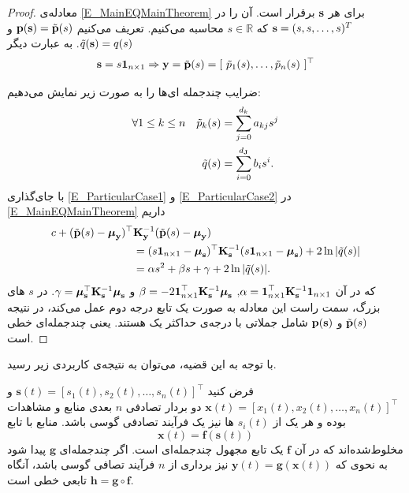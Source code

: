 \documentclass[oneside]{thesis}
\begin{document}
\begin{proof}
معادله‌ی 
 \eqref{E_MainEQMainTheorem}
 برای هر 
 $\mathbf{s}$
 برقرار است. آن را در 
 $\mathbf{s} = (s, s, \dots, s)^T$
که
$s\in \mathbb{R}$
 محاسبه می‌کنیم.  تعریف می‌کنیم
 ${\bf p}(\mathbf{s}) = \tilde{{\bf p}}(s)$
 و 
 $\tilde{{q}}(\mathbf{s}) = q(s)$.
 به عبارت دیگر
 \begin{equation}
 {\bf s}=s\boldsymbol{1}_{n \times 1} \Rightarrow
 {\bf y}=\tilde{\bf p}(s)=[\ \tilde{p}_1(s),\dots,\tilde{p}_n(s)\ ]^\top
 \end{equation}
 
ضرایب چندجمله‌ ای‌ها را به صورت زیر نمایش می‌دهیم:
 \begin{align}
 \label{E_ParticularCase1}
 \forall 1 \le k \le n \quad
 \tilde{p}_k(s) &= \sum_{j=0}^{d_k} a_{kj}s^{j} \\
 \label{E_ParticularCase2}
 \tilde{q}(s) &= \sum_{i=0}^{d_{\bf J}} b_{i}s^{i}.
 \end{align}
با جای‌گذاری
\eqref{E_ParticularCase1} و
\eqref{E_ParticularCase2} 
در
\eqref{E_MainEQMainTheorem} 
داریم
\begin{align}
\label{E_ParticularMainEQ}
c + (\tilde{\bf p}(s)-\boldsymbol{\mu}_{\bf y})^\top
&
{\bf K}_{\bf y}^{-1}(\tilde{\bf p}(s)-\boldsymbol{\mu}_{\bf y}) \nonumber \\
&= (s \boldsymbol{1}_{n \times 1}-\boldsymbol{\mu}_{\bf s})^\top{\bf K}_{\bf s}^{-1}(s \boldsymbol{1}_{n \times 1}-\boldsymbol{\mu}_{\bf s}) + 2\ln |\tilde{q}(s)| \nonumber \\
&= \alpha s^2 + \beta s + \gamma + 2\ln |\tilde{q}(s)|.
\end{align}
که در آن
$\alpha = \boldsymbol{1}_{n \times 1}^\top{\bf K}_{\bf s}^{-1}\boldsymbol{1}_{n \times 1}$, $\beta = -2\boldsymbol{1}_{n \times 1}^\top{\bf K}_{\bf s}^{-1}\boldsymbol{\mu}_{\bf s}$ 
و
 $\gamma = \boldsymbol{\mu}_{\bf s}^\top{\bf K}_{\bf s}^{-1}\boldsymbol{\mu}_{\bf s}$.
 در 
$s$
های بزرگ، سمت راست این معادله به صورت یک تابع درجه دوم عمل می‌کند، در نتیجه 
$\tilde{\bf p}(s)$
و 
${\bf p}(\mathbf{s})$
شامل جملاتی با درجه‌ی حداکثر یک هستند. یعنی چندجمله‌ای خطی است.

\end{proof}
با توجه به این قضیه‌، می‌توان به  نتیجه‌ی کاربردی زیر رسید.

\begin{corollary}
	\label{corrr}
	فرض کنید 
	$\mathbf{s}(t) = [s_1(t), s_2(t), \dots, s_n(t)]^\top$
	و
	$\mathbf{x}(t)= [x_1(t), x_2(t), \dots, x_n(t)]^\top$
	دو بردار تصادفی $n$ بعدی منابع و مشاهدات بوده و هر یک از
	$s_i(t)$
	ها نیز یک فرآیند تصادفی گوسی باشد. منابع با تابع
	$$\mathbf{x}(t) = \mathbf{f}(\mathbf{s}(t))$$
	مخلوط‌شده‌اند که در آن
	$\mathbf{f}$
	یک تابع مجهول چندجمله‌ای است. اگر چندجمله‌ای 
	$\mathbf{g}$
	پیدا شود به نحوی که 
	$\mathbf{y}(t) = \mathbf{g}(\mathbf{x}(t))$
	نیز برداری از $n$ فرآیند تصافی گوسی باشد، آنگاه 
	$\mathbf{h} = \mathbf{g}\circ \mathbf{f} $
	تابعی خطی است.
\end{corollary}
\end{document}
